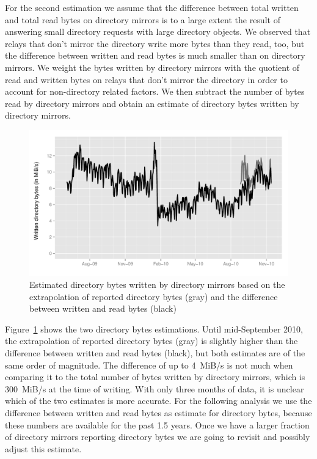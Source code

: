 \documentclass{article}
\begin{document}
For the second estimation we assume that the difference between total
written and total read bytes on directory mirrors is to a large extent the
result of answering small directory requests with large directory objects.
We observed that relays that don't mirror the directory write more bytes
than they read, too, but the difference between written and read bytes is
much smaller than on directory mirrors.
We weight the bytes written by directory mirrors with the quotient of
read and written bytes on relays that don't mirror the directory in order
to account for non-directory related factors.
We then subtract the number of bytes read by directory mirrors and obtain
an estimate of directory bytes written by directory mirrors.

\begin{figure}[t]
\includegraphics[width=\textwidth]{dirbytes-mirrors.pdf}
\caption{Estimated directory bytes written by directory mirrors based on
the extrapolation of reported directory bytes (gray) and the difference
between written and read bytes (black)}
\label{fig:dirbytes-mirrors}
\end{figure}

Figure~\ref{fig:dirbytes-mirrors} shows the two directory bytes
estimations.
Until mid-September 2010, the extrapolation of reported directory bytes
(gray) is slightly higher than the difference between written and read
bytes (black), but both estimates are of the same order of magnitude.
The difference of up to 4~MiB/s is not much when comparing it to the total
number of bytes written by directory mirrors, which is 300~MiB/s at the
time of writing.
With only three months of data, it is unclear which of the two estimates
is more accurate.
For the following analysis we use the difference between written and read
bytes as estimate for directory bytes, because these numbers are available
for the past 1.5 years.
Once we have a larger fraction of directory mirrors reporting directory
bytes we are going to revisit and possibly adjust this estimate.
\end{document}
